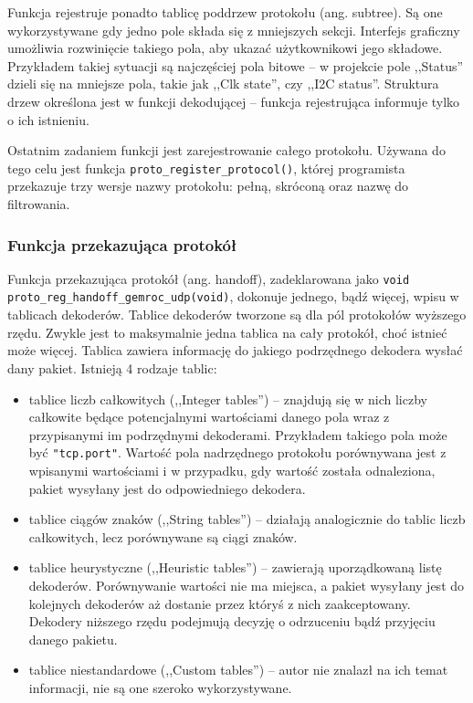 \documentclass[a4paper, 12pt, twoside, openright]{article}
\begin{document}
	Funkcja rejestruje ponadto tablicę poddrzew protokołu (ang. subtree). Są one wykorzystywane
	gdy jedno pole składa się z mniejszych sekcji. Interfejs graficzny umożliwia rozwinięcie takiego pola, aby ukazać użytkownikowi jego składowe.
	Przykładem takiej sytuacji są najczęściej pola bitowe -- w projekcie pole ,,Status'' dzieli się na mniejsze pola, takie jak
	,,Clk state'', czy ,,I2C status''. Struktura drzew określona jest w funkcji dekodującej --
	funkcja rejestrująca informuje tylko o ich istnieniu.

	Ostatnim zadaniem funkcji jest zarejestrowanie całego protokołu. Używana do tego celu jest funkcja \texttt{proto\_register\_protocol()},
	której programista przekazuje trzy wersje nazwy protokołu: pełną, skróconą oraz nazwę do filtrowania.

	\subsubsection{Funkcja przekazująca protokół}
	\indent\par
	Funkcja przekazująca protokół (ang. handoff), zadeklarowana jako \texttt{void proto\_reg\_handoff\_gemroc\_udp(void)}, dokonuje jednego, bądź więcej, wpisu w tablicach
	dekoderów.
	Tablice dekoderów tworzone są dla pól protokołów wyższego rzędu. Zwykle jest to maksymalnie jedna tablica na cały protokół, choć istnieć może więcej.
	Tablica zawiera informację do jakiego podrzędnego dekodera wysłać dany pakiet.
	Istnieją 4 rodzaje tablic:
	\begin{itemize}
		\item tablice liczb całkowitych (,,Integer tables'') -- znajdują się w nich liczby całkowite będące potencjalnymi wartościami danego pola
			wraz z przypisanymi im podrzędnymi dekoderami. Przykładem takiego pola może być \texttt{"tcp.port"}. Wartość pola nadrzędnego protokołu
			porównywana jest z wpisanymi wartościami i w przypadku, gdy wartość została odnaleziona, pakiet wysyłany jest do odpowiedniego dekodera.
		\item tablice ciągów znaków (,,String tables'') -- działają analogicznie do tablic liczb całkowitych, lecz porównywane są ciągi znaków.
		\item tablice heurystyczne (,,Heuristic tables'') -- zawierają uporządkowaną listę dekoderów. Porównywanie wartości nie ma miejsca, a pakiet
			wysyłany jest do kolejnych dekoderów aż dostanie przez któryś z nich zaakceptowany. Dekodery niższego rzędu podejmują decyzję o odrzuceniu
			bądź przyjęciu danego pakietu.
		\item tablice niestandardowe (,,Custom tables'') -- autor nie znalazł na ich temat informacji, nie są one szeroko wykorzystywane.
	\end{itemize}
\end{document}
